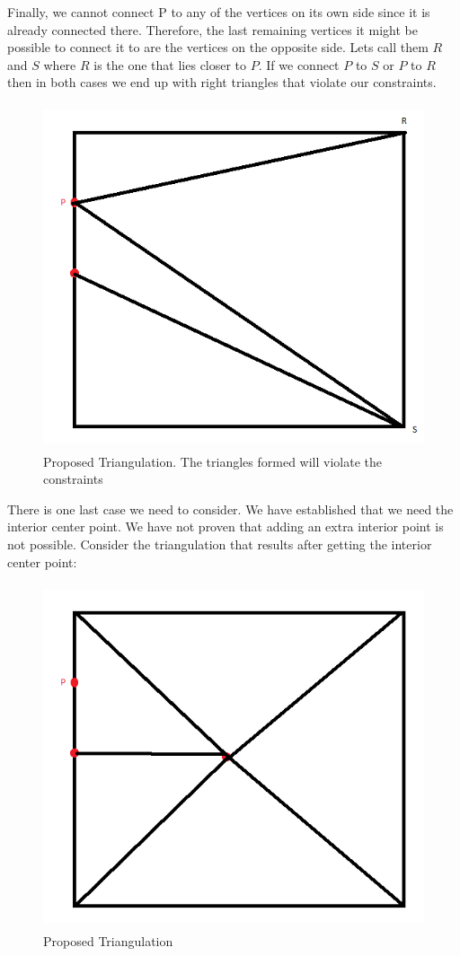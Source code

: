\documentclass[11pt,psfig]{article}
\begin{document}
Finally, we cannot connect P to any of the vertices on its own side since it is already connected there. Therefore, the last remaining vertices it might be possible to connect it to are the vertices on the opposite side. Lets call them $R$ and $S$ where $R$ is the one that lies closer to $P$. If we connect $P$ to $S$ or $P$ to $R$ then in both cases we end up with right triangles that violate our constraints. 
\begin{figure}[H]
\centering
\includegraphics[height=4in]{hw5prob3_diagram3.png}
\caption{Proposed Triangulation. The triangles formed will violate the constraints}
\end{figure} 
There is one last case we need to consider. We have established that we need the interior center point. We have not proven that adding an extra interior point is not possible. Consider the triangulation that results after getting the interior center point:
\begin{figure}[H]
\centering
\includegraphics[height=4in]{hw5prob3_diagram4.png}
\caption{Proposed Triangulation}
\end{figure}  
\end{document}
